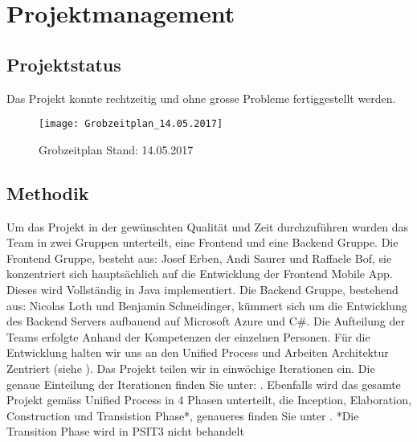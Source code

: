 \section{Projektmanagement}\label{projektmanagement}
\subsection{Projektstatus}\label{projektstatus}
Das Projekt konnte rechtzeitig und ohne grosse Probleme fertiggestellt werden.

\begin{figure}
  \centering
  \texttt{[image: Grobzeitplan\_14.05.2017]}
  \caption{Grobzeitplan Stand: 14.05.2017}
\end{figure}

\subsection{Methodik}
Um das Projekt in der gewünschten Qualität und Zeit durchzuführen wurden das Team in zwei Gruppen unterteilt, eine Frontend und eine Backend Gruppe.
Die Frontend Gruppe, besteht aus: Josef Erben, Andi Saurer und Raffaele Bof, sie konzentriert sich hauptsächlich auf die Entwicklung der Frontend Mobile App. Dieses wird Vollständig in Java implementiert.
Die Backend Gruppe, bestehend aus: Nicolas Loth und Benjamin Schneidinger, kümmert sich um die Entwicklung des Backend Servers aufbauend auf Microsoft Azure und C#.
Die Aufteilung der Teams erfolgte Anhand der Kompetenzen der einzelnen Personen.
Für die Entwicklung halten wir uns an den Unified Process und Arbeiten Architektur Zentriert (siehe ). Das Projekt teilen wir in einwöchige Iterationen ein. Die genaue Einteilung der Iterationen finden Sie unter: .
Ebenfalls wird das gesamte Projekt gemäss Unified Process in 4 Phasen unterteilt, die Inception, Elaboration, Construction und Transistion Phase*, genaueres finden Sie unter .
*Die Transition Phase wird in PSIT3 nicht behandelt


